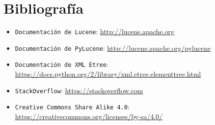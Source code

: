\chapter{Bibliografía}

\begin{itemize}
\item{\tt Documentación de Lucene}: \url{http://lucene.apache.org}
\item{\tt Documentación de PyLucene}: \url{http://lucene.apache.org/pylucene}
\item{\tt Documentación de XML Etree}: \url{https://docs.python.org/2/library/xml.etree.elementtree.html}
\item{\tt StackOverflow}: \url{https://stackoverflow.com}

\item{\tt Creative Commons Share Alike 4.0}: \url{https://creativecommons.org/licenses/by-sa/4.0/}
\end{itemize}

